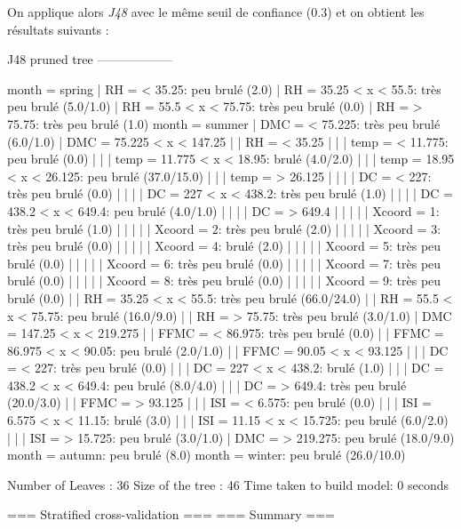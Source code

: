 \documentclass{article}
\begin{document}
\begin{sffamily}
On applique alors \textit{J48} avec le même seuil de confiance ($0.3$) et on obtient les résultats suivants :

\begin{center}
	\begin{boxedverbatim}
J48 pruned tree
------------------

month = spring
|   RH = < 35.25: peu brulé (2.0)
|   RH = 35.25 < x < 55.5: très peu brulé (5.0/1.0)
|   RH = 55.5 < x < 75.75: très peu brulé (0.0)
|   RH = > 75.75: très peu brulé (1.0)
month = summer
|   DMC = < 75.225: très peu brulé (6.0/1.0)
|   DMC = 75.225 < x < 147.25
|   |   RH = < 35.25
|   |   |   temp = < 11.775: peu brulé (0.0)
|   |   |   temp = 11.775 < x < 18.95: brulé (4.0/2.0)
|   |   |   temp = 18.95 < x < 26.125: peu brulé (37.0/15.0)
|   |   |   temp = > 26.125
|   |   |   |   DC = < 227: très peu brulé (0.0)
|   |   |   |   DC = 227 < x < 438.2: très peu brulé (1.0)
|   |   |   |   DC = 438.2 < x < 649.4: peu brulé (4.0/1.0)
|   |   |   |   DC = > 649.4
|   |   |   |   |   Xcoord = 1: très peu brulé (1.0)
|   |   |   |   |   Xcoord = 2: très peu brulé (2.0)
|   |   |   |   |   Xcoord = 3: très peu brulé (0.0)
|   |   |   |   |   Xcoord = 4: brulé (2.0)
|   |   |   |   |   Xcoord = 5: très peu brulé (0.0)
|   |   |   |   |   Xcoord = 6: très peu brulé (0.0)
|   |   |   |   |   Xcoord = 7: très peu brulé (0.0)
|   |   |   |   |   Xcoord = 8: très peu brulé (0.0)
|   |   |   |   |   Xcoord = 9: très peu brulé (0.0)
|   |   RH = 35.25 < x < 55.5: très peu brulé (66.0/24.0)
|   |   RH = 55.5 < x < 75.75: peu brulé (16.0/9.0)
|   |   RH = > 75.75: très peu brulé (3.0/1.0)
|   DMC = 147.25 < x < 219.275
|   |   FFMC = < 86.975: très peu brulé (0.0)
|   |   FFMC = 86.975 < x < 90.05: peu brulé (2.0/1.0)
|   |   FFMC = 90.05 < x < 93.125
|   |   |   DC = < 227: très peu brulé (0.0)
|   |   |   DC = 227 < x < 438.2: brulé (1.0)
|   |   |   DC = 438.2 < x < 649.4: peu brulé (8.0/4.0)
|   |   |   DC = > 649.4: très peu brulé (20.0/3.0)
|   |   FFMC = > 93.125
|   |   |   ISI = < 6.575: peu brulé (0.0)
|   |   |   ISI = 6.575 < x < 11.15: brulé (3.0)
|   |   |   ISI = 11.15 < x < 15.725: peu brulé (6.0/2.0)
|   |   |   ISI = > 15.725: peu brulé (3.0/1.0)
|   DMC = > 219.275: peu brulé (18.0/9.0)
month = autumn: peu brulé (8.0)
month = winter: peu brulé (26.0/10.0)

Number of Leaves  : 	36
Size of the tree : 	46
Time taken to build model: 0 seconds
	\end{boxedverbatim}
\end{center}
\begin{center}
	\begin{boxedverbatim}
=== Stratified cross-validation ===
=== Summary ===


\end{boxedverbatim}
\end{center}
\end{sffamily}
\end{document}
